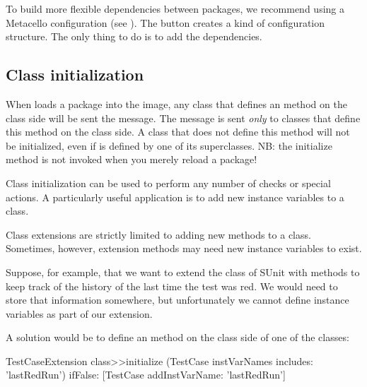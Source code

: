 \documentclass[a4paper,10pt,twoside]{book}
\begin{document}

To build more flexible dependencies between packages, we recommend using a Metacello configuration (see ). The  button creates a kind of configuration structure. The only thing to do is to add the dependencies.

\subsection{Class initialization}

When \Mont loads a package into the image, any class that defines an  method on the class side will be sent the  message. The message is sent \emph{only} to classes that define this method on the class side. A class that does not define this method will not be initialized, even if  is defined by one of its superclasses. NB: the initialize method is not invoked when you merely reload a package!


Class initialization can be used to perform any number of checks or special actions.
A particularly useful application is to add new instance variables to a class.

Class extensions are strictly limited to adding new methods to a class.
Sometimes, however, extension methods may need new instance variables to exist.

Suppose, for example, that we want to extend the  class of SUnit with methods to keep track of the history of the last time the test was red.  We would need to store that information somewhere, but unfortunately we cannot define instance variables as part of our extension.

A solution would be to define an  method on the class side of one of the classes:

\begin{code}{}
TestCaseExtension class>>initialize
	(TestCase instVarNames includes: 'lastRedRun') 
		ifFalse: [TestCase addInstVarName: 'lastRedRun']
\end{code}
\end{document}

